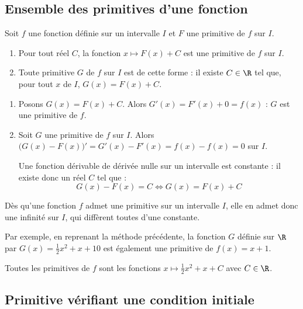 \subsection{Ensemble des primitives d'une fonction}

\begin{prop}
	Soit $f$ une fonction définie sur un intervalle $I$ et $F$ une primitive de $f$ sur $I$.

	\begin{enumerate}
		\item Pour tout réel $C$, la fonction $x \mapsto F(x) + C$ est une primitive de $f$ sur $I$.
		\item Toute primitive $G$ de $f$ sur $I$ est de cette forme : il existe $C\in\R$ tel que, pour tout $x$ de $I$, $G(x) = F(x) + C$.
	\end{enumerate}
\end{prop}

\begin{demo}
	\nline
	\begin{enumerate}
		\item Posons $G(x) = F(x) + C$. Alors $G'(x) = F'(x) + 0 = f(x)$ : $G$ est une primitive de $f$.
		\item Soit $G$ une primitive de $f$ sur $I$. Alors $\big({G(x) - F(x)}\big)' = G'(x) - F'(x) = f(x) - f(x) = 0$ sur $I$.

		      Une fonction dérivable de dérivée nulle sur un intervalle est constante : il existe donc un réel $C$ tel que :
		      \[
			      G(x) - F(x) = C \iff G(x)=F(x) + C
		      \]
	\end{enumerate}
\end{demo}

\begin{rem}
	Dès qu'une fonction $f$ admet une primitive sur un intervalle $I$, elle en admet donc une infinité sur $I$, qui diffèrent toutes d'une constante.

	Par exemple, en reprenant la méthode précédente, la fonction $G$ définie sur $\R$ par $G(x) = \tfrac{1}{2}x^2 + x + 10$ est également une primitive de $f(x) = x + 1$.

	Toutes les primitives de $f$ sont les fonctions $x \mapsto \tfrac{1}{2}x^2 + x + C$ avec $C \in \R$.
\end{rem}

\subsection{Primitive vérifiant une condition initiale}

